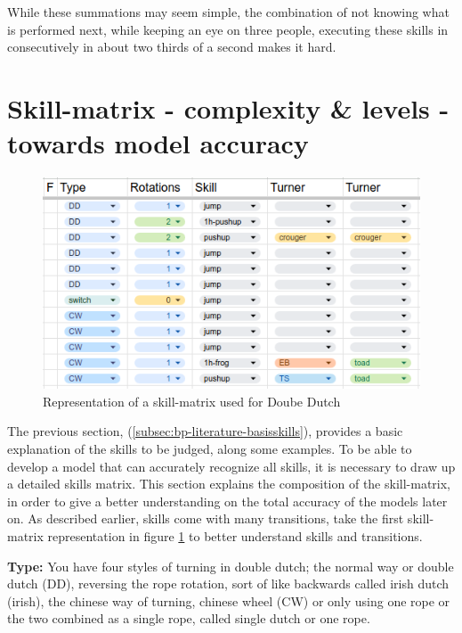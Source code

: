 While these summations may seem simple, the combination of not knowing what is performed next, while keeping an eye on three people, executing these skills in consecutively in about two thirds of a second makes it hard.

\section{Skill-matrix - complexity \& levels - towards model accuracy}
\label{subsec:skillcomplexiteit}

\begin{figure}
    \centering
    \includegraphics[width=0.95\linewidth]{img/doubledutch-matrix}
    \caption[skill-matrix-DD]{Representation of a skill-matrix used for Doube Dutch}
    \label{fig:doubledutch-skill-matrix}
\end{figure}

The previous section, (\ref{subsec:bp-literature-basisskills}), provides a basic explanation of the skills to be judged, along some examples. To be able to develop a model that can accurately recognize all skills, it is necessary to draw up a detailed skills matrix. This section explains the composition of the skill-matrix, in order to give a better understanding on the total accuracy of the models later on. As described earlier, skills come with many transitions, take the first skill-matrix representation in figure \ref{fig:doubledutch-skill-matrix} to better understand skills and transitions.

\textbf{Type:} You have four styles of turning in double dutch; the normal way or double dutch (DD), reversing the rope rotation, sort of like backwards called irish dutch (irish), the chinese way of turning, chinese wheel (CW) or only using one rope or the two combined as a single rope, called single dutch or one rope.

